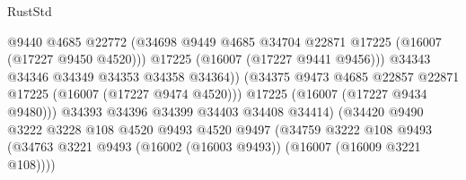 \begin{lexlean}{RustStd}
\begin{coremodule}
                                              @9440
                                              @4685
                                              @22772
                                              (@34698
                                                @9449
                                                @4685
                                                @34704
                                                @22871
                                                @17225
                                                (@16007 (@17227 @9450 @4520)))
                                              @17225
                                              (@16007 (@17227 @9441 @9456)))
                                            @34343
                                            @34346
                                            @34349
                                            @34353
                                            @34358
                                            @34364))
                                        (@34375
                                          @9473
                                          @4685
                                          @22857
                                          @22871
                                          @17225
                                          (@16007 (@17227 @9474 @4520)))
                                        @17225
                                        (@16007 (@17227 @9434 @9480)))
                                      @34393
                                      @34396
                                      @34399
                                      @34403
                                      @34408
                                      @34414)
                                    (@34420
                                      @9490
                                      @3222
                                      @3228
                                      @108
                                      @4520
                                      @9493
                                      @4520
                                      @9497
                                      (@34759
                                        @3222
                                        @108
                                        @9493
                                        (@34763
                                          @3221
                                          @9493
                                          (@16002 (@16003 @9493))
                                          (@16007 (@16009 @3221 @108))))

\end{coremodule}
\end{lexlean}
